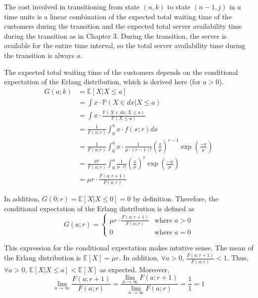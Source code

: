 The cost involved in transitioning from state $(n, k)$ to state $(n - 1, j)$ in $a$ time units is a linear combination of the expected total waiting time of the customers during the transition and the expected total server availability time during the transition as in Chapter 3. During the transition, the server is available for the entire time interval, so the total server availability time during the transition is always $a$.

The expected total waiting time of the customers depends on the conditional expectation of the Erlang distribution, which is derived here (for $a > 0$).
\begin{align*}
	G (a; k) & = \mathbb{E} [X | X \leq a] \\
	& = \int x \cdot \mathbb{P} (X \in dx | X \leq a) \\
	& = \int x \cdot \frac{\mathbb{P} (X \in dx, X \leq a)}{\mathbb{P} (X \leq a)} \\
	& = \frac{1}{F (a; r)} \int_{0}^{a} x \cdot f(x; r) dx \\
	& = \frac{1}{F (a; r)} \int_{0}^{a} x \cdot \frac{1}{\mu \cdot (r - 1)!} \left( \frac{x}{\mu} \right)^{r - 1} \exp \left( \frac{-x}{\mu} \right) \\
	& = \frac{\mu r}{F (a; r)} \int_{0}^{a} \frac{1}{\mu \cdot r!} \left( \frac{x}{\mu} \right)^{r} \exp \left( \frac{-x}{\mu} \right) \\
	& = \mu r \cdot \frac{F (a; r + 1)}{F (a; r)}
\end{align*}

In addition, $G (0; r) = \mathbb{E} [X | X \leq 0] = 0$ by definition. Therefore, the conditional expectation of the Erlang distribution is defined as
\begin{equation}
	G (a; r) = \begin{cases} \mu r \cdot \frac{F (a; r + 1)}{F (a; r)} & \text{where $a > 0$} \\ 0 & \text{where $a = 0$} \end{cases}
\end{equation}

This expression for the conditional expectation makes intutive sense. The mean of the Erlang distribution is $\mathbb{E} [X] = \mu r$. In addition, $\forall a > 0$, $\frac{F (a; r + 1)}{F (a; r)} < 1$. Thus, $\forall a > 0$, $\mathbb{E} [X | X \leq a] < \mathbb{E} [X]$ as expected. Moreover, 
\begin{equation}
	\lim_{a \to \infty} \frac{F (a; r + 1)}{F (a; r)} = \frac{\displaystyle \lim_{a \to \infty} F (a; r + 1)}{\displaystyle \lim_{a \to \infty} F (a; r)} = \frac{1}{1} = 1
\end{equation}

